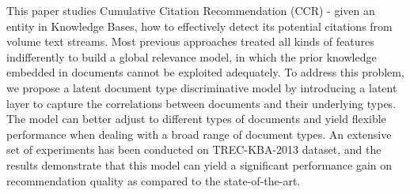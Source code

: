 This paper studies Cumulative Citation Recommendation (CCR) - given an entity in Knowledge Bases, how to effectively detect its potential citations from volume text streams. Most previous approaches treated all kinds of features indifferently to build a global relevance model, in which the prior knowledge embedded in documents cannot be exploited adequately. To address this problem, we propose a latent document type discriminative model by introducing a latent layer to capture the correlations between documents and their underlying types. The model can better adjust to different types of documents and yield flexible performance when dealing with a broad range of document types. An extensive set of experiments has been conducted on TREC-KBA-2013 dataset, and the results demonstrate that this model can yield a significant performance gain on recommendation quality as compared to the state-of-the-art.
